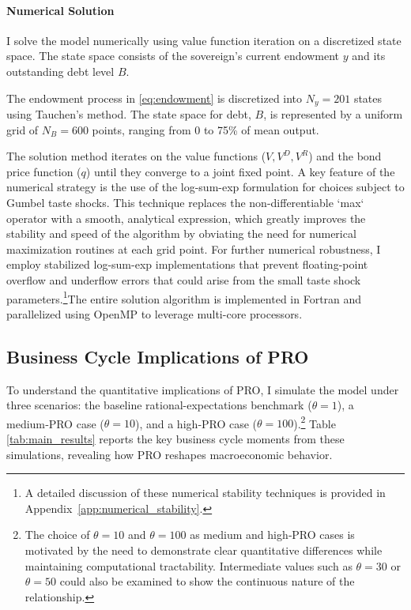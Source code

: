 \documentclass[12pt]{article}
\theoremstyle{plain}
\begin{document}
\begin{table}[h!]
\end{table}

\paragraph{Numerical Solution}
I solve the model numerically using value function iteration on a discretized
state space. The state space consists of the sovereign's current endowment $y$
and its outstanding debt level $B$.

The endowment process in \eqref{eq:endowment} is discretized into $N_y = 201$
states using Tauchen's method. The state space for debt, $B$, is represented by
a uniform grid of $N_B = 600$ points, ranging from 0 to 75\% of mean output.

The solution method iterates on the value functions ($V, V^D, V^R$) and the
bond price function ($q$) until they converge to a joint fixed point. A key
feature of the numerical strategy is the use of the log-sum-exp formulation for
choices subject to Gumbel taste shocks. This technique replaces the
non-differentiable `max` operator with a smooth, analytical expression, which
greatly improves the stability and speed of the algorithm by obviating the need
for numerical maximization routines at each grid point. For further numerical
robustness, I employ stabilized log-sum-exp implementations that prevent
floating-point overflow and underflow errors that could arise from the small
taste shock parameters.\footnote{ A detailed discussion of these numerical
	stability techniques is provided in Appendix~\ref{app:numerical_stability}.
}The entire solution algorithm is implemented in Fortran and parallelized using
OpenMP to leverage multi-core processors.

\subsection{Business Cycle Implications of PRO}

To understand the quantitative implications of PRO, I simulate the model under
three scenarios: the baseline rational-expectations benchmark ($\theta=1$), a
medium‑PRO case ($\theta=10$), and a high‑PRO case ($\theta=100$).\footnote{The
	choice of $\theta=10$ and $\theta=100$ as medium and high‑PRO cases is
	motivated by the need to demonstrate clear quantitative differences while
	maintaining computational tractability. Intermediate values such as $\theta=30$
	or $\theta=50$ could also be examined to show the continuous nature of the
	relationship.} Table \ref{tab:main_results} reports the key business cycle
moments from these simulations, revealing how PRO reshapes macroeconomic
behavior.
\end{document}
